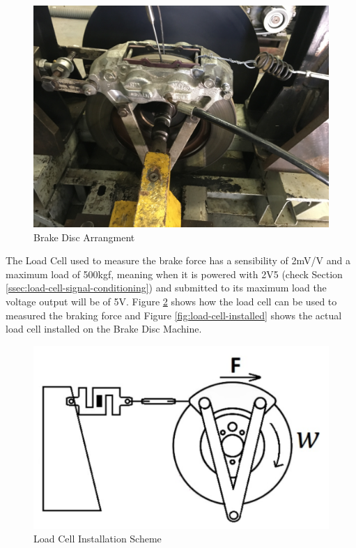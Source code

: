 		\begin{figure}[htbp]
			\centering
			\includegraphics[width=.7\textwidth]{figuras/fig-brake-disc}
			\caption{Brake Disc Arrangment}
			\label{fig:brake-disc}
		\end{figure}
		\par

		The Load Cell used to measure the brake force has a sensibility of 2mV/V and a maximum load of 500kgf, meaning when it is powered with 2V5 (check Section \ref{ssec:load-cell-signal-conditioning}) and submitted to its maximum load the voltage output will be of 5V. Figure \ref{fig:load-cell-installation-scheme} shows how the load cell can be used to measured the braking force and Figure \ref{fig:load-cell-installed} shows the actual load cell installed on the Brake Disc Machine.

		\begin{figure}[htbp]
			\centering
			\includegraphics[width=.7\textwidth]{figuras/fig-load-cell-installation-scheme}
			\caption{Load Cell Installation Scheme \cite{load-cell-caxeta2017}}
			\label{fig:load-cell-installation-scheme}
		\end{figure}

